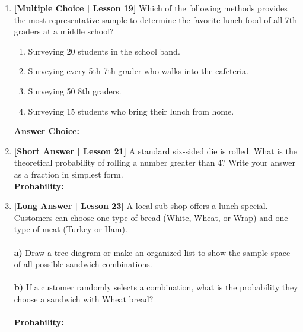 \documentclass[12pt, letterpaper, fleqn]{article}
\newcommand{\blankshorter}{\underline{\hspace{2.0cm}}}
\newcommand{\blanklong}{\underline{\hspace{6.5cm}}}
\begin{document}
\begin{enumerate}[leftmargin=0.6cm, itemsep=\fill, start=14]

\item \textbf{[Multiple Choice | Lesson 19]} Which of the following methods provides the most representative sample to determine the favorite lunch food of all 7th graders at a middle school?
\begin{enumerate}[label=\Alph*)]
    \item Surveying 20 students in the school band.
    \item Surveying every 5th 7th grader who walks into the cafeteria.
    \item Surveying 50 8th graders.
    \item Surveying 15 students who bring their lunch from home.
\end{enumerate}
\textbf{Answer Choice:} \blankshorter

\newpage

\item \textbf{[Short Answer | Lesson 21]} A standard six-sided die is rolled. What is the theoretical probability of rolling a number greater than 4? Write your answer as a fraction in simplest form.
\vspace{1.5cm} \\
\textbf{Probability:} \blanklong

\item \textbf{[Long Answer | Lesson 23]} A local sub shop offers a lunch special. Customers can choose one type of bread (White, Wheat, or Wrap) and one type of meat (Turkey or Ham).
\\ \\
\textbf{a)} Draw a tree diagram or make an organized list to show the sample space of all possible sandwich combinations.
\vspace{3.5cm} \\ \\
\textbf{b)} If a customer randomly selects a combination, what is the probability they choose a sandwich with Wheat bread?
\\ \\
\textbf{Probability:} \blanklong

\end{enumerate}
\end{document}
